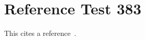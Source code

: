 \documentclass{article}
\begin{document}
\section{Reference Test 383}
This cites a reference~\cite{test383}.

\end{document}
